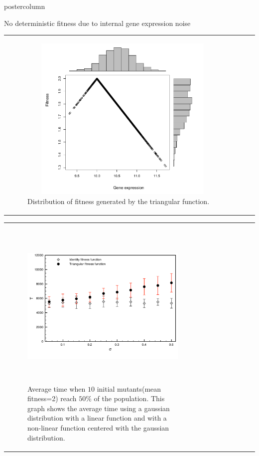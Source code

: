 \documentclass[final,hyperref={pdfpagelabels=false}]{beamer}
\begin{document}
\begin{frame}
\begin{columns}
\begin{column}{.49\textwidth}
\begin{beamercolorbox}[center,wd=\textwidth]{postercolumn}
\begin{minipage}[T]{.95\textwidth}
{\begin{block}{No deterministic fitness due to internal gene expression noise}
\begin{tabularx}{\linewidth}{ZZZ}
\begin{figure}
\includegraphics[width=11cm,height=8cm]{images/triangularfunctionHistogram.pdf}
\caption{Distribution of fitness generated by the triangular function.}
\end{figure}
\\
\end{tabularx}
\begin{tabularx}{\linewidth}{ZZZ}
\begin{figure}
\includegraphics[width=11cm,height=8cm]{images/SigmaVariationLTfitness.pdf}
\caption{Average time when $10$ initial mutants(mean fitness=2) reach  $50\%$ of the population. This graph shows the average  time using a gaussian distribution with a linear function and with a non-linear function centered with the gaussian distribution. }
\end{figure}
&
\begin{figure}

\end{figure}
\end{tabularx}
\end{block}}
\end{minipage}
\end{beamercolorbox}
\end{column}
\end{columns}
\end{frame}
\end{document}
